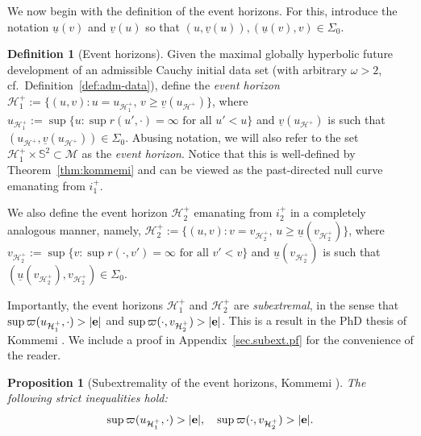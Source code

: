 \documentclass[10pt, reqno]{amsart}
\newtheorem{proposition}[theorem]{Proposition}
\theoremstyle{definition}
\newtheorem{definition}[theorem]{Definition}
\theoremstyle{remark}
\numberwithin{equation}{section}
\newcommand{\0}{\emptyset}
\newcommand{\omg}{\omega}
\newcommand{\calH}{\mathcal H}
\newcommand{\EH}{\calH^{+}}
\newcommand{\ub}{\underline{u}}
\begin{document}
We now begin with the definition of the event horizons. For this, introduce the notation $\ub(v)$ and $\underline{v}(u)$ so that $(u,\underline{v}(u)), (\ub(v),v)\in \Sigma_0$.
\begin{definition}[Event horizons]\label{def.EH}
Given the maximal globally hyperbolic future development of an admissible Cauchy initial data set (with arbitrary $\omg>2$, cf.~Definition~\ref{def:adm-data}), define the \emph{event horizon} $\EH_1:=\{(u,v): u=u_{\EH_1},\, v\geq \underline{v}(u_{\EH}) \}$, where $u_{\EH_1}:=\sup \{u: \sup r(u', \cdot)=\infty \mbox{ for all }u' < u\}$ and $\underline{v}(u_{\EH})$ is such that $(u_{\EH},\underline{v}(u_{\EH}))\in \Sigma_0$. Abusing notation, we will also refer to the set $\EH_1\times \mathbb S^2\subset \mathcal M$ as the \emph{event horizon}. Notice that this is well-defined by Theorem~\ref{thm:kommemi} and can be viewed as the past-directed null curve emanating from $i^+_1$.

We also define the event horizon $\EH_2$ emanating from $i^+_2$ in a completely analogous manner, namely, $\EH_2:=\{(u,v): v=v_{\EH_2},\, u\geq \ub(v_{\EH_2}) \}$, where $v_{\EH_{2}}:=\sup \{v: \sup r(\cdot, v')=\infty \mbox{ for all }v' < v\}$ and $\ub(v_{\EH_2})$ is such that $(\ub(v_{\EH_2}),v_{\EH_2})\in \Sigma_0$.
\end{definition}

Importantly, the event horizons $\EH_1$ and $\EH_2$ are \emph{subextremal}, in the sense that $\sup \varpi(u_{\EH_1}, \cdot) >|{\bf e}|$ and $\sup{ \varpi(\cdot,v_{\EH_2})} >|{\bf e|}$. This is a result in the PhD thesis of Kommemi \cite{KomThe}. We include a proof in  Appendix~\ref{sec.subext.pf} for the convenience of the reader.
\begin{proposition}[Subextremality of the event horizons, Kommemi \cite{KomThe}]\label{prop.subextremality}
The following strict inequalities hold:
$$\sup \varpi(u_{\EH_1}, \cdot)>|{\bf e}|,\quad \sup \varpi(\cdot, v_{\EH_{2}})>|{\bf e}|.$$
\end{proposition}
\end{document}
